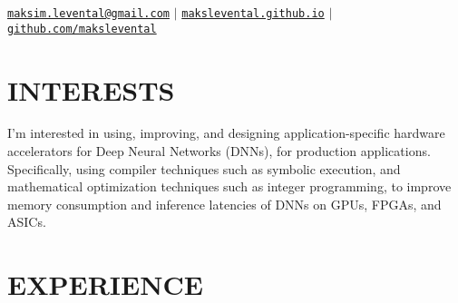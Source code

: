\documentclass[11pt,letterpaper,roman,colorlinks,linkcolor=blue]{moderncv}
\newcommand*{\modern}{\fontfamily{qhv}\selectfont}
\newcommand{\mystyle}[1]{\textcolor{mygrey}{\modern #1}}
\newcommand{\mysectionstyle}[1]{\large\mystyle{#1}}
\begin{document}
\makecvtitle

\vspace{-16mm}
\begin{center}
\mystyle{\href{maksim.levental@gmail.com}{\texttt{maksim.levental@gmail.com}} $|$ \href{https://makslevental.github.io/}{\texttt{makslevental.github.io}} $|$ \href{https://github.com/makslevental}{\texttt{github.com/makslevental}}}
\end{center}


\section{\mysectionstyle{INTERESTS}}

I'm interested in using, improving, and designing application-specific hardware accelerators for Deep Neural Networks (DNNs), for production applications.
Specifically, using compiler techniques such as symbolic execution, and mathematical optimization techniques such as integer programming, to improve memory consumption and inference latencies of DNNs on GPUs, FPGAs, and ASICs. 


\section{\mysectionstyle{EXPERIENCE}}
\end{document}
